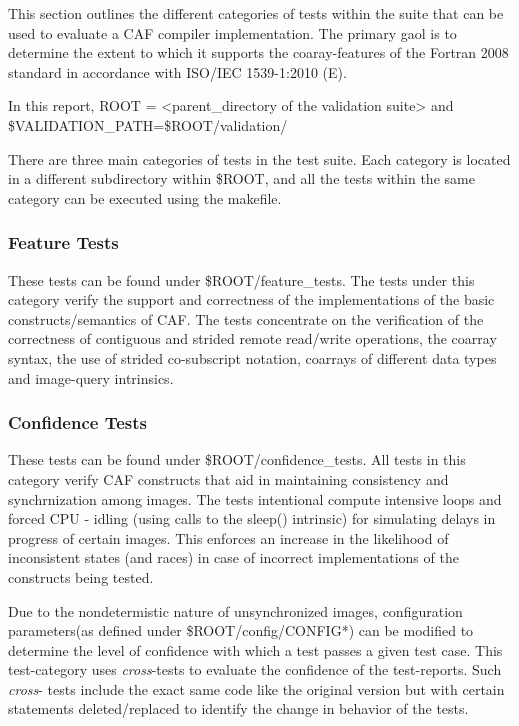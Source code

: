 This section outlines the different categories of tests within the suite 
that can be used to evaluate a CAF compiler
implementation. The primary gaol is to determine the extent to which it supports the
coaray-features of the Fortran 2008 standard in accordance with
ISO/IEC 1539-1:2010 (E)\cite{ftn2008}.


In this report, ROOT = <parent\_directory of the validation suite> and \$VALIDATION\_PATH=\$ROOT/validation/

There are three main categories of tests in the test suite. Each category is located in a different subdirectory within \$ROOT, and all the tests within the same category can be executed using the makefile. 

\subsubsection{Feature Tests}

These tests can be found under \$ROOT/feature\_tests. The tests under this category verify the support and correctness of the implementations of the basic constructs/semantics of CAF. The tests concentrate on the verification of the correctness of contiguous and strided remote read/write operations, the coarray syntax, the use of strided co-subscript notation, coarrays of different data types and
image-query intrinsics.


\subsubsection{Confidence Tests}

These tests can be found under \$ROOT/confidence\_tests. All tests in this
category verify CAF constructs that aid in maintaining consistency and synchrnization among images. The tests intentional compute intensive loops and forced CPU - idling (using calls to the sleep() intrinsic) for simulating delays in progress of certain images.
This enforces an increase in the likelihood of inconsistent states (and races) in case of incorrect implementations of the constructs being tested.

Due to the nondetermistic nature of unsynchronized images, configuration parameters(as defined under \$ROOT/config/CONFIG*) can be modified to determine the level of confidence with which a test passes a given test case. This test-category uses \emph{cross}-tests to evaluate the confidence of the test-reports. Such \emph{cross}- tests include the exact same code like the
original version but with certain statements deleted/replaced to identify the change in behavior of the tests. 



